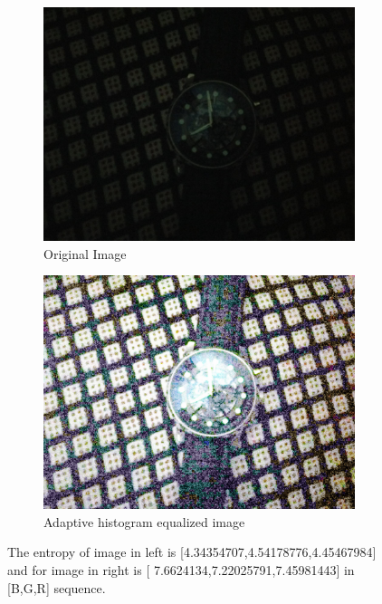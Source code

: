 \documentclass[12pt, a4paper, font = Times New Roman]{article}
\begin{document}
\begin{figure}[!h]
  \begin{subfigure}[b]{0.5\textwidth}
    \includegraphics[width=\textwidth]{watch.jpg}
    \caption{Original Image}
    \label{fig:lena}
  \end{subfigure}
  \hfill
  \begin{subfigure}[b]{0.5\textwidth}
    \includegraphics[width=\textwidth]{result_watch.jpg}
    \caption{Adaptive histogram equalized image}
    \label{fig:result_lena}
  \end{subfigure}
  \caption{The entropy of image in left is [4.34354707,4.54178776,4.45467984] and for image in right is [ 7.6624134,7.22025791,7.45981443] in [B,G,R] sequence.}
\end{figure}
\end{document}
